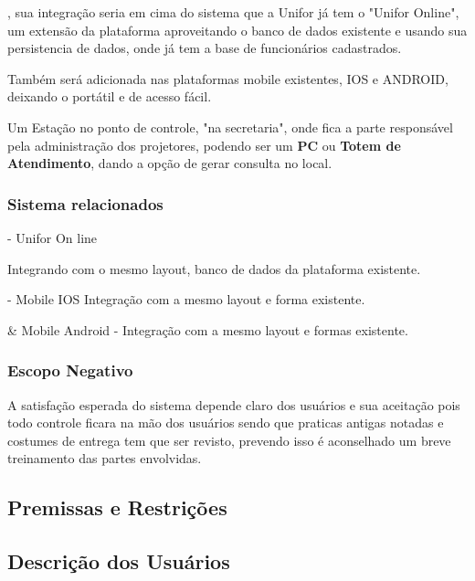 \mySiglaProject, sua integração seria em cima do sistema que a Unifor já tem o
"Unifor Online", um extensão da plataforma aproveitando o banco de dados
existente e usando sua persistencia de dados, onde já tem a base de funcionários
cadastrados.

Também será adicionada nas plataformas mobile existentes, IOS e ANDROID,
deixando o portátil e de acesso fácil. 

Um Estação no ponto de controle, "na secretaria", onde fica a parte responsável
pela administração dos projetores, podendo ser um \textbf{PC} ou \textbf{Totem
de Atendimento}, dando a opção de gerar consulta no local. 


\subsubsection{Sistema relacionados}

  \begin{center} 


    \mySiglaProject - Unifor On line

    Integrando com o mesmo layout, banco de dados da plataforma existente.

    \hspace{2.0cm}
    \hline{}
    \hspace{2.0cm}


    \mySiglaProject - Mobile IOS
    Integração com a mesmo layout e forma existente. 


    \hspace{2.0cm}
    \hline{}
    \hspace{2.0cm}



    \mySiglaProject & Mobile Android - Integração com a mesmo layout e formas existente.

    \hspace{2.0cm}
    \hline{}
    \hspace{2.0cm}
  
  \end{center}

\subsubsection{Escopo Negativo}

A satisfação esperada do sistema depende claro dos usuários e sua aceitação pois
todo controle ficara na mão dos usuários sendo que praticas antigas notadas e
costumes de entrega tem que ser revisto, prevendo isso é aconselhado um breve
treinamento das partes envolvidas. 


\subsection{Premissas e Restrições}


\subsection{Descrição dos Usuários}



